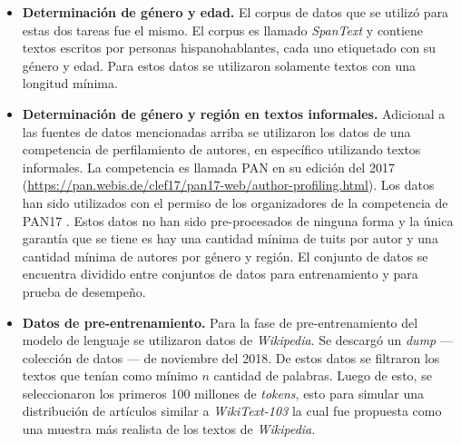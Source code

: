 \begin{itemize}

\item \textbf{Determinación de género y edad.} El corpus de datos que se utilizó para estas dos tareas fue el mismo. El corpus es llamado \textit{SpanText} \parencite{villegas:2014:CACIC} y contiene textos escritos por personas hispanohablantes, cada uno etiquetado con su género y edad. Para estos datos se utilizaron solamente textos con una longitud mínima.

\item \textbf{Determinación de género y región en textos informales.} Adicional a las fuentes de datos mencionadas arriba se utilizaron los datos de una competencia de perfilamiento de autores, en específico utilizando textos informales. La competencia es llamada PAN en su edición del 2017 (\url{https://pan.webis.de/clef17/pan17-web/author-profiling.html}). Los datos han sido utilizados con el permiso de los organizadores de la competencia de PAN17 \parencite{rangel2017proceedings}. Estos datos no han sido pre-procesados de ninguna forma y la única garantía que se tiene es hay una cantidad mínima de tuits por autor y una cantidad mínima de autores por género y región. El conjunto de datos se encuentra dividido entre conjuntos de datos para entrenamiento y para prueba de desempeño.

\item \textbf{Datos de pre-entrenamiento.} Para la fase de pre-entrenamiento del modelo de lenguaje se utilizaron datos de \textit{Wikipedia}. Se descargó un \textit{dump} --- colección de datos --- de noviembre del 2018. De estos datos se filtraron los textos que tenían como mínimo $n$ cantidad de palabras. Luego de esto, se seleccionaron los primeros 100 millones de \textit{tokens}, esto para simular una distribución de artículos similar a \textit{WikiText-103} \parencite{merity2016pointer} la cual fue propuesta como una muestra más realista de los textos de \textit{Wikipedia}.
\end{itemize}
